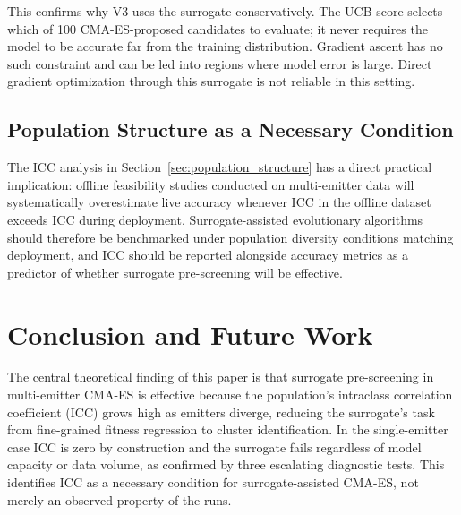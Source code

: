 \documentclass[conference]{IEEEtran}
\begin{document}
This confirms why V3 uses the surrogate conservatively. The UCB score
selects which of 100 CMA-ES-proposed candidates to evaluate; it never
requires the model to be accurate far from the training distribution.
Gradient ascent has no such constraint and can be led into regions where
model error is large. Direct gradient optimization through this surrogate
is not reliable in this setting.

\subsection{Population Structure as a Necessary Condition}

The ICC analysis in Section~\ref{sec:population_structure} has a direct
practical implication: offline feasibility studies conducted on
multi-emitter data will systematically overestimate live accuracy whenever
ICC in the offline dataset exceeds ICC during deployment. Surrogate-assisted
evolutionary algorithms should therefore be benchmarked under population
diversity conditions matching deployment, and ICC should be reported
alongside accuracy metrics as a predictor of whether surrogate
pre-screening will be effective.



\section{Conclusion and Future Work}

The central theoretical finding of this paper is that surrogate
pre-screening in multi-emitter CMA-ES is effective because the
population's intraclass correlation coefficient (ICC) grows high as
emitters diverge, reducing the surrogate's task from fine-grained fitness
regression to cluster identification. In the single-emitter case ICC is
zero by construction and the surrogate fails regardless of model capacity
or data volume, as confirmed by three escalating diagnostic tests. This
identifies ICC as a necessary condition for surrogate-assisted CMA-ES,
not merely an observed property of the runs.
\end{document}
